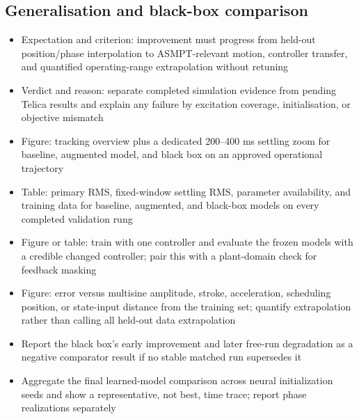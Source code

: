 
\subsection{Generalisation and black-box comparison}
\begin{itemize}
\item Expectation and criterion: improvement must progress from held-out position/phase interpolation to ASMPT-relevant motion, controller transfer, and quantified operating-range extrapolation without retuning
\item Verdict and reason: separate completed simulation evidence from pending Telica results and explain any failure by excitation coverage, initialisation, or objective mismatch
\item Figure: tracking overview plus a dedicated 200--400 ms settling zoom for baseline, augmented model, and black box on an approved operational trajectory
\item Table: primary RMS, fixed-window settling RMS, parameter availability, and training data for baseline, augmented, and black-box models on every completed validation rung
\item Figure or table: train with one controller and evaluate the frozen models with a credible changed controller; pair this with a plant-domain check for feedback masking
\item Figure: error versus multisine amplitude, stroke, acceleration, scheduling position, or state-input distance from the training set; quantify extrapolation rather than calling all held-out data extrapolation
\item Report the black box's early improvement and later free-run degradation as a negative comparator result if no stable matched run supersedes it
\item Aggregate the final learned-model comparison across neural initialization seeds and show a representative, not best, time trace; report phase realizations separately
\end{itemize}
